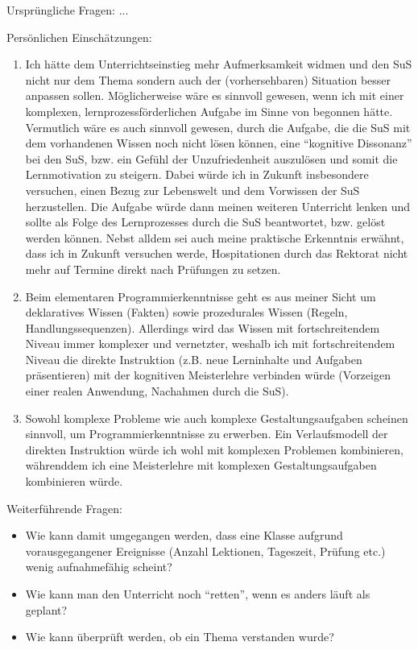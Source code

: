 \begin{myExBox}[title=Persönliche Beantwortung der Fragestellungen]
Ursprüngliche Fragen:
...

Persönlichen Einschätzungen:
\begin{enumerate}
\item Ich hätte dem Unterrichtseinstieg mehr Aufmerksamkeit widmen und den SuS nicht nur dem Thema sondern auch der (vorhersehbaren) Situation besser anpassen sollen. Möglicherweise wäre es sinnvoll gewesen, wenn ich mit einer komplexen, lernprozessförderlichen Aufgabe im Sinne von \cite{tulo} begonnen hätte. Vermutlich wäre es auch sinnvoll gewesen, durch die Aufgabe, die die SuS mit dem vorhandenen Wissen noch nicht lösen können, eine ``kognitive Dissonanz'' bei den SuS, bzw. ein Gefühl der Unzufriedenheit auszulösen und somit die Lernmotivation zu steigern. Dabei würde ich in Zukunft insbesondere versuchen, einen Bezug zur Lebenswelt und dem Vorwissen der SuS herzustellen. Die Aufgabe würde dann meinen weiteren Unterricht lenken und sollte als Folge des Lernprozesses durch die SuS beantwortet, bzw. gelöst werden können. Nebst alldem sei auch meine praktische Erkenntnis erwähnt, dass ich in Zukunft versuchen werde, Hospitationen durch das Rektorat nicht mehr auf Termine direkt nach Prüfungen zu setzen.
\item Beim elementaren Programmierkenntnisse geht es aus meiner Sicht um deklaratives Wissen (Fakten) sowie prozedurales Wissen (Regeln, Handlungssequenzen). Allerdings wird das Wissen mit fortschreitendem Niveau immer komplexer und vernetzter, weshalb ich mit fortschreitendem Niveau die direkte Instruktion (z.B. neue Lerninhalte und Aufgaben präsentieren) mit der kognitiven Meisterlehre verbinden würde (Vorzeigen einer realen Anwendung, Nachahmen durch die SuS).
\item Sowohl komplexe Probleme wie auch komplexe Gestaltungsaufgaben scheinen sinnvoll, um Programmierkenntnisse zu erwerben. Ein Verlaufsmodell der direkten Instruktion würde ich wohl mit komplexen Problemen kombinieren, währenddem ich eine Meisterlehre mit komplexen Gestaltungsaufgaben kombinieren würde.
\end{enumerate}
Weiterführende Fragen:
\begin{itemize}
\item Wie kann damit umgegangen werden, dass eine Klasse aufgrund vorausgegangener Ereignisse (Anzahl Lektionen, Tageszeit, Prüfung etc.) wenig aufnahmefähig scheint?
\item Wie kann man den Unterricht noch ``retten'', wenn es anders läuft als geplant?
\item Wie kann überprüft werden, ob ein Thema verstanden wurde?
\end{itemize}

\end{myExBox}